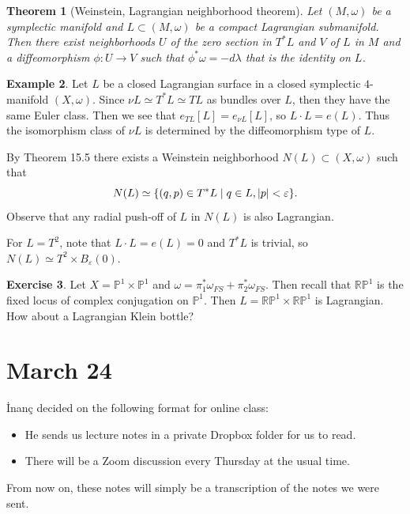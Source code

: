 \documentclass[leqno, openany]{memoir}
\newtheorem{thm}{Theorem}[chapter]
\theoremstyle{definition}
\newtheorem{exm}[thm]{Example}
\newtheorem{exer}[thm]{Exercise}
\theoremstyle{remark}
\theoremstyle{plain}
\theoremstyle{definition}
\theoremstyle{remark}
\newcommand{\R}{\mathbb{R}}
\renewcommand{\P}{\mathbb{P}}
\newcommand{\ep}{\varepsilon}
\begin{document}
    \begin{thm}[Weinstein, Lagrangian neighborhood theorem]
        Let $(M, \omega)$ be a symplectic manifold and $L \subset (M, \omega)$ be a compact Lagrangian submanifold. Then there exist neighborhoods $U$ of the zero section in $T^*L$ and $V$ of $L$ in $M$ and a diffeomorphism $\phi: U \to V$ such that $\phi^* \omega = - d \lambda$ that is the identity on $L$.
    \end{thm}

    \begin{exm}
        Let $L$ be a closed Lagrangian surface in a closed symplectic $4$-manifold $(X, \omega)$. Since $\nu L \simeq T^*L \simeq TL$ as bundles over $L$, then they have the same Euler class. Then we see that $e_{TL}[L] = e_{\nu L}[L]$, so $L \cdot L = e(L)$. Thus the isomorphism class of $\nu L$ is determined by the diffeomorphism type of $L$.

    By Theorem 15.5 there exists a Weinstein neighborhood $N(L) \subset (X, \omega)$ such that 
    \[N(L) \simeq \{ (q,p) \in T^* L \mid q \in L, \abs{p} < \ep \}. \]
    Observe that any radial push-off of $L$ in $N(L)$ is also Lagrangian.

    For $L = T^2$, note that $L \cdot L = e(L) = 0$ and $T^*L$ is trivial, so $N(L) \simeq T^2 \times B_{\ep}(0)$.
    \end{exm}

    \begin{exer}
        Let $X = \P^1 \times \P^1$ and $\omega = \pi_1^* \omega_{FS} + \pi_2^* \omega_{FS}$. Then recall that $\R\P^1$ is the fixed locus of complex conjugation on $\P^1$. Then $L = \R\P^1 \times \R\P^1$ is Lagrangian. How about a Lagrangian Klein bottle?
    \end{exer}

    \chapter{March 24}%
    \label{cha:march_24}
    
    \.Inan\c{c} decided on the following format for online class:
    \begin{itemize}
        \item He sends us lecture notes in a private Dropbox folder for us to read.
        \item There will be a Zoom discussion every Thursday at the usual time.
    \end{itemize}
    From now on, these notes will simply be a transcription of the notes we were sent.
\end{document}

